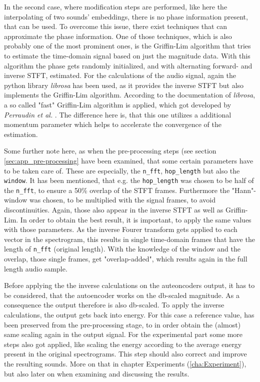 In the second case, where modification steps are performed, like here the interpolating of two sounds' embeddings, there is no phase information present, that can be used. To overcome this issue, there exist techniques that can approximate the phase information. One of those techniques, which is also probably one of the most prominent ones, is the Griffin-Lim \cite{Griffin1984} algorithm that tries to estimate the time-domain signal based on just the magnitude data. With this algorithm the phase gets randomly initialized, and with alternating forward- and inverse STFT, estimated. For the calculations of the audio signal, again the python library \textit{librosa} \cite{brian_mcfee_2022_6097378} has been used, as it provides the inverse STFT but also implements the Griffin-Lim algorithm. According to the documentation of \textit{librosa}, a so called "fast" Griffin-Lim algorithm is applied, which got developed by \textit{Perraudin et al.} \cite{Perraudin2013}. The difference here is, that this one utilizes a additional momentum parameter which helps to accelerate the convergence of the estimation. 

Some further note here, as when the pre-processing steps (see section \ref{sec:app_pre-processing} have been examined, that some certain parameters have to be taken care of. These are especially, the \texttt{n\_fft}, \texttt{hop\_length} but also the \texttt{window}. It has been mentioned, that e.g. the \texttt{hop\_length} was chosen to be half of the \texttt{n\_fft}, to ensure a 50\% overlap of the STFT frames. Furthermore the "Hann"-window was chosen, to be multiplied with the signal frames, to avoid discontinuities. Again, those also appear in the inverse STFT as well as Griffin-Lim. In order to obtain the best result, it is important, to apply the same values with those parameters. As the inverse Fourer transform gets applied to each vector in the spectrogram, this results in single time-domain frames that have the length of \texttt{n\_fft} (original length). With the knowledge of the window and the overlap, those single frames, get "overlap-added", which results again in the full length audio sample. 

Before applying the the inverse calculations on the auteoncoders output, it has to be considered, that the autoencoder works on the db-scaled magnitude. As a consequence the output therefore is also db-scaled. To apply the inverse calculations, the output gets back into energy. For this case a reference value, has been preserved from the pre-processing stage, to in order obtain the (almost) same scaling again in the output signal. For the experimental part some more steps also got applied, like scaling the energy according to the average energy present in the original spectrograms. This step should also correct and improve the resulting sounds. More on that in chapter Experiments (\ref{cha:Experiment}), but also later on when examining and discussing the results.\\


